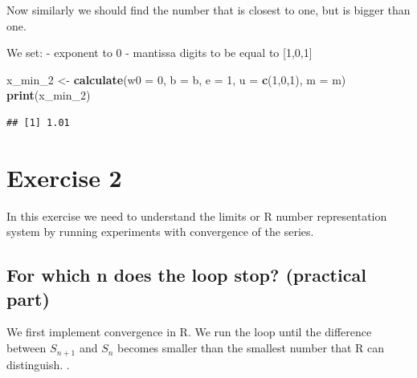 \documentclass[
]{article}
\newenvironment{Shaded}{\begin{snugshade}}{\end{snugshade}}
\newcommand{\AttributeTok}[1]{\textcolor[rgb]{0.13,0.29,0.53}{#1}}
\newcommand{\ControlFlowTok}[1]{\textcolor[rgb]{0.13,0.29,0.53}{\textbf{#1}}}
\newcommand{\DecValTok}[1]{\textcolor[rgb]{0.00,0.00,0.81}{#1}}
\newcommand{\FunctionTok}[1]{\textcolor[rgb]{0.13,0.29,0.53}{\textbf{#1}}}
\newcommand{\NormalTok}[1]{#1}
\newcommand{\OtherTok}[1]{\textcolor[rgb]{0.56,0.35,0.01}{#1}}
\newcommand{\SpecialCharTok}[1]{\textcolor[rgb]{0.81,0.36,0.00}{\textbf{#1}}}
\newcommand{\StringTok}[1]{\textcolor[rgb]{0.31,0.60,0.02}{#1}}
\begin{document}
Now similarly we should find the number that is closest to one, but is
bigger than one.

We set: - exponent to 0 - mantissa digits to be equal to {[}1,0,1{]}

\begin{Shaded}
\begin{Highlighting}[]
\NormalTok{x\_min\_2 }\OtherTok{\textless{}{-}} \FunctionTok{calculate}\NormalTok{(}\AttributeTok{w0 =} \DecValTok{0}\NormalTok{, }\AttributeTok{b =}\NormalTok{ b, }\AttributeTok{e =} \DecValTok{1}\NormalTok{, }\AttributeTok{u =} \FunctionTok{c}\NormalTok{(}\DecValTok{1}\NormalTok{,}\DecValTok{0}\NormalTok{,}\DecValTok{1}\NormalTok{), }\AttributeTok{m =}\NormalTok{ m)}
\FunctionTok{print}\NormalTok{(x\_min\_2)}
\end{Highlighting}
\end{Shaded}

\begin{verbatim}
## [1] 1.01
\end{verbatim}

\section{Exercise 2}\label{exercise-2}

In this exercise we need to understand the limits or R number
representation system by running experiments with convergence of the
series.

\subsection{For which n does the loop stop? (practical
part)}\label{for-which-n-does-the-loop-stop-practical-part}

We first implement convergence in R. We run the loop until the
difference between \(S_{n+1}\) and \(S_n\) becomes smaller than the
smallest number that R can distinguish. .

\begin{Shaded}
\end{Shaded}
\end{document}
